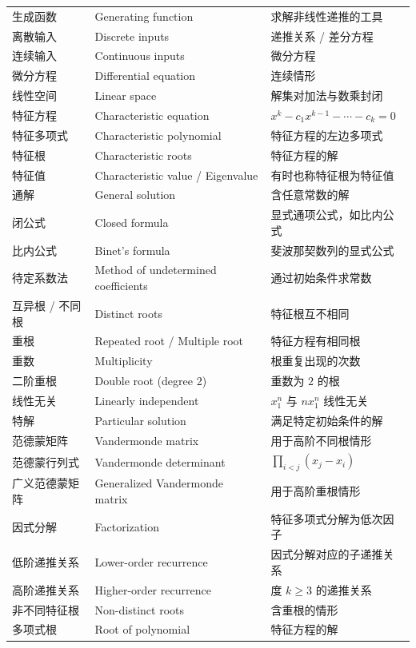 \documentclass[UTF8,11pt,a4paper]{ctexbook}   %
\theoremstyle{definition}
\begin{document}
\begin{longtable}{|p{4.8cm}|p{4.8cm}|p{4.8cm}|}
生成函数 & Generating function & 求解非线性递推的工具 \\
离散输入 & Discrete inputs & 递推关系 / 差分方程 \\
连续输入 & Continuous inputs & 微分方程 \\
微分方程 & Differential equation & 连续情形 \\
线性空间 & Linear space & 解集对加法与数乘封闭 \\
特征方程 & Characteristic equation & $x^k-c_1x^{k-1}-\cdots-c_k=0$ \\
特征多项式 & Characteristic polynomial & 特征方程的左边多项式 \\
特征根 & Characteristic roots & 特征方程的解 \\
特征值 & Characteristic value / Eigenvalue & 有时也称特征根为特征值 \\
通解 & General solution & 含任意常数的解 \\
闭公式 & Closed formula & 显式通项公式，如比内公式 \\
比内公式 & Binet's formula & 斐波那契数列的显式公式 \\
待定系数法 & Method of undetermined coefficients & 通过初始条件求常数 \\
互异根 / 不同根 & Distinct roots & 特征根互不相同 \\
重根 & Repeated root / Multiple root & 特征方程有相同根 \\
重数 & Multiplicity & 根重复出现的次数 \\
二阶重根 & Double root (degree 2) & 重数为 $2$ 的根 \\
线性无关 & Linearly independent & $x_1^n$ 与 $n x_1^n$ 线性无关 \\
特解 & Particular solution & 满足特定初始条件的解 \\
范德蒙矩阵 & Vandermonde matrix & 用于高阶不同根情形 \\
范德蒙行列式 & Vandermonde determinant & $\prod_{i<j}(x_j-x_i)$ \\
广义范德蒙矩阵 & Generalized Vandermonde matrix & 用于高阶重根情形 \\
因式分解 & Factorization & 特征多项式分解为低次因子 \\
低阶递推关系 & Lower-order recurrence & 因式分解对应的子递推关系 \\
高阶递推关系 & Higher-order recurrence & 度 $k \ge 3$ 的递推关系 \\
非不同特征根 & Non-distinct roots & 含重根的情形 \\
多项式根 & Root of polynomial & 特征方程的解 \\

\end{longtable}
\end{document}
